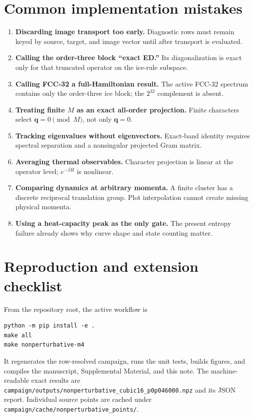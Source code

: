 \documentclass[11pt]{article}
\newcommand{\bq}{\bm q}
\newcommand{\code}[1]{\texttt{#1}}
\begin{document}
\section{Common implementation mistakes}

\begin{enumerate}
 \item \textbf{Discarding image transport too early.}  Diagnostic rows must
 remain keyed by source, target, and image vector until after transport is
 evaluated.
 \item \textbf{Calling the order-three block ``exact ED.''}  Its diagonalization
 is exact only for that truncated operator on the ice-rule subspace.
 \item \textbf{Calling FCC-32 a full-Hamiltonian result.}  The active FCC-32
 spectrum contains only the order-three ice block; the $2^{32}$ complement is
 absent.
 \item \textbf{Treating finite $M$ as an exact all-order projection.}  Finite
 characters select $\bq=0\pmod M$, not only $\bq=0$.
 \item \textbf{Tracking eigenvalues without eigenvectors.}  Exact-band
 identity requires spectral separation and a nonsingular projected Gram
 matrix.
 \item \textbf{Averaging thermal observables.}  Character projection is linear
 at the operator level; $e^{-\beta H}$ is nonlinear.
 \item \textbf{Comparing dynamics at arbitrary momenta.}  A finite cluster has
 a discrete reciprocal translation group.  Plot interpolation cannot create
 missing physical momenta.
 \item \textbf{Using a heat-capacity peak as the only gate.}  The present
 entropy failure already shows why curve shape and state counting matter.
\end{enumerate}

\section{Reproduction and extension checklist}

From the repository root, the active workflow is
\begin{lstlisting}
python -m pip install -e .
make all
make nonperturbative-m4
\end{lstlisting}
It regenerates the row-resolved campaign, runs the unit tests, builds figures,
and compiles the manuscript, Supplemental Material, and this note.  The
machine-readable exact results are
\code{campaign/outputs/nonperturbative\_cubic16\_p0p046000.npz} and its JSON
report.  Individual source points are cached under
\code{campaign/cache/nonperturbative\_points/}.
\end{document}
